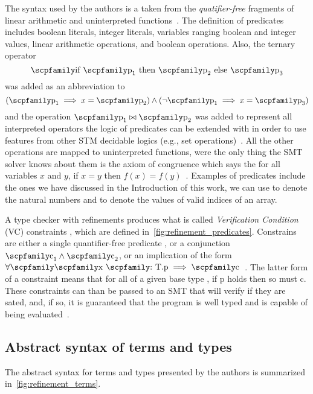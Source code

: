 \documentclass[
  oneside,
  english,
  coorientadorbanca,
  noabntexcite
]{ufsc-thesis-rn46-2019}
\newcommand{\codett}[1]{\text{\scpfamily#1}}
\newcommand{\code}[1]{\text{\scpfamily\setlength\spaceskip{0.35em}#1}}
\newcommand{\typer}[2]{\code{#1 \codett{:} #2}}
\begin{document}
The syntax used by the authors is a taken from the \textit{quatifier-free} fragments of linear arithmetic and uninterpreted functions~\cite{jhala2020tutorial}.
The definition of predicates \code{p} includes boolean literals, integer literals, variables ranging boolean and integer values, linear arithmetic operations, and boolean operations.
Also, the ternary operator
\begin{equation*}
  \code{if $\code{p}_1$ then $\code{p}_2$ else $\code{p}_3$}
\end{equation*}
was added as an abbreviation to
\begin{equation*}
  (\code{p}_1 \implies x = \code{p}_2)\land(\lnot \code{p}_1 \implies x = \code{p}_3)
\end{equation*}
and the operation $\code{p}_1\bowtie\code{p}_2$ was added to represent all interpreted operators the logic of predicates can be extended with in order to use features from other STM decidable logics (e.g., set operations)~\cite{jhala2020tutorial}.
All the other operations are mapped to uninterpreted functions, were the only thing the SMT solver knows about them is the axiom of congruence which says the for all variables $x$ and $y$, if $x = y$ then $f(x) = f(y)$~\cite{jhala2020tutorial}.
Examples of predicates include the ones we have discussed in the Introduction of this work, we can use \code{0 <= v} to denote the natural numbers and \code{0 <= v \&\& v = length(x)} to denote the values of valid indices of an array.

A type checker with refinements produces what is called \textit{Verification Condition} (VC) constraints \code{c}, which are defined in~\cref{fig:refinement_predicates}.
Constrains are either a single quantifier-free predicate \code{p}, or a conjunction $\code{c}_1 \land \code{c}_2$, or an implication of the form $\forall\code{\typer{x}{T}.p}\implies\code{c}$~\cite{jhala2020tutorial}.
The latter form of a constraint means that for all \code{x} of a given base type \code{b}, if p holds then so must c.
These constraints can than be passed to an SMT that will verify if they are sated, and, if so, it is guaranteed that the program is well typed and is capable of being evaluated~\cite{jhala2020tutorial}.

\subsection{Abstract syntax of terms and types}

The abstract syntax for terms and types presented by the authors is summarized in~\cref{fig:refinement_terms}.
\end{document}
